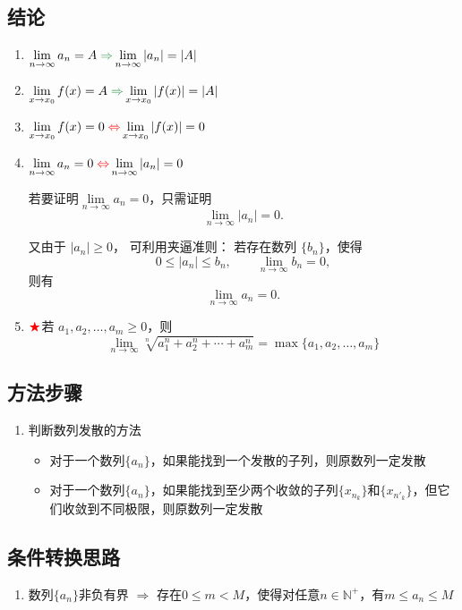 \documentclass[../book.tex]{subfiles}
\begin{document}
    \subsection{结论}

    \begin{enumerate}
        \item $\lim\limits_{n\to\infty} a_n = A \; {\color[rgb]{0.2, 0.6, 0.3}{\Rightarrow}} \lim\limits_{n\to\infty} |a_n| = |A|$
        \item $\lim\limits_{x\to x_0} f(x) = A \; {\color[rgb]{0.2, 0.6, 0.3}{\Rightarrow}} \lim\limits_{x\to x_0} |f(x)| = |A|$
        \item $\lim\limits_{x\to x_0} f(x) = 0 \; {\color{red}{\Leftrightarrow}} \lim\limits_{x\to x_0} |f(x)| = 0$
        \item $\lim\limits_{n\to\infty} a_n = 0 \; {\color{red}{\Leftrightarrow}} \lim\limits_{n\to\infty} |a_n| = 0$
        \begin{analysisbox}[Example]
            若要证明$\lim\limits_{n\to\infty} a_n = 0$，只需证明
            \[
                \lim_{n\to\infty} |a_n| = 0.
            \]

            又由于 $|a_n|\ge 0$，
            可利用夹逼准则：
            若存在数列 $\{b_n\}$，使得
            \[
                0 \le |a_n| \le b_n,
                \qquad
                \lim_{n\to\infty} b_n = 0,
            \]
            则有
            \[
                \lim_{n\to\infty} a_n = 0.
            \]
        \end{analysisbox}
        \item $\color{red}{\bigstar}$若 $a_1,a_2,\dots,a_m \ge 0$，则
        \[
            \lim_{n\to\infty} \sqrt[n]{a_1^n + a_2^n + \cdots + a_m^n}
            = \max\{a_1,a_2,\dots,a_m\}
        \]
    \end{enumerate}

    \subsection{方法步骤}

    \begin{enumerate}
        \item 判断数列发散的方法
        \begin{itemize}
            \item 对于一个数列$\{a_n\}$，如果能找到一个发散的子列，则原数列一定发散
            \item 对于一个数列$\{a_n\}$，如果能找到至少两个收敛的子列$\{x_{n_k}\}$和$\{x_{n'_k}\}$，但它们收敛到不同极限，则原数列一定发散
        \end{itemize}
    \end{enumerate}

    \subsection{条件转换思路}

    \begin{enumerate}
        \item 数列$\{a_n\}$非负有界 $\Rightarrow$ 存在$0 \leq m < M$，使得对任意$n \in \mathbb{N}^+$，有$m \leq a_n \leq M$
    \end{enumerate}
\end{document}
